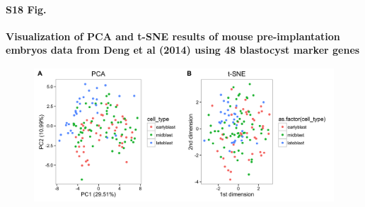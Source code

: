 \documentclass[10pt,letterpaper]{article}
\begin{document}
\paragraph*{S18 Fig.}

\label{figS18}
{\bf Visualization of PCA and t-SNE results of mouse pre-implantation embryos data from Deng et al (2014) using 48 blastocyst marker genes}
\begin{figure}[ht]
\centering
\includegraphics[height=2in, width=5in]{../../src/figure/deng-digging-final.Rmd/combined-visualization-1.png}
\end{figure}
\end{document}
